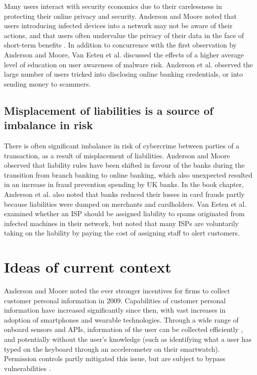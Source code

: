\documentclass[11pt]{article}
\begin{document}
Many users interact with security economics due to their carelessness in protecting their online privacy and security. Anderson and Moore \cite[Sec. 1]{anderson2009information} noted that users introducing infected devices into a network may not be aware of their actions, and that users often undervalue the privacy of their data in the face of short-term benefits \cite[Sec. 5]{anderson2009information}. In addition to concurrence with the first observation by Anderson and Moore, Van Eeten et al. \cite[p. 2, pp. 19-24]{van2010role} discussed the effects of a higher average level of education on user awareness of malware risk. Anderson et al. \cite[12.3.2, 12.3.8]{anderson2013measuring} observed the large number of users tricked into disclosing online banking credentials, or into sending money to scammers.

\subsection{Misplacement of liabilities is a source of imbalance in risk}

There is often significant imbalance in risk of cybercrime between parties of a transaction, as a result of misplacement of liabilities. Anderson and Moore \cite[Sec. 2]{anderson2009information} observed that liability rules have been shifted in favour of the banks during the transition from branch banking to online banking, which also unexpected resulted in an increase in fraud prevention spending by UK banks. In the book chapter, Anderson et al. \cite[12.3.1]{anderson2013measuring} also noted that banks reduced their losses in card frauds partly because liabilities were dumped on merchants and cardholders. Van Eeten et al. \cite[p. 3]{van2010role} examined whether an ISP should be assigned liability to spams originated from infected machines in their network, but noted that many ISPs are voluntarily taking on the liability by paying the cost of assigning staff to alert customers.  

\section{Ideas of current context}

Anderson and Moore \cite[Sec. 5]{anderson2009information} noted the ever stronger incentives for firms to collect customer personal information in 2009. Capabilities of customer personal information have increased significantly since then, with vast increases in adoption of smartphones and wearable technologies. Through a wide range of onboard sensors and APIs, information of the user can be collected efficiently \cite{wagner2014device}, and potentially without the user's knowledge (such as identifying what a user has typed on the keyboard through an accelerometer on their smartwatch). Permission controls partly mitigated this issue, but are subject to bypass vulnerabilities \cite{fang2014permission}. 
\end{document}
